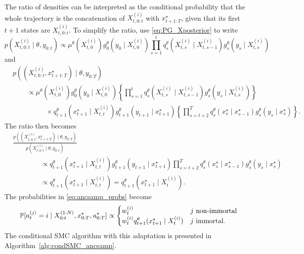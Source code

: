 The ratio of densities can be interpreted as the conditional probability that the whole trajectory is the concatenation of $X_{t,0:t}^{(i)}$ with $x_{t+1:T}^\star$, given that its first $t+1$ states are $X_{t,0:t}^{(i)}$.
To simplify the ratio, use \eqref{eq:PG_Xposterior} to write
\begin{equation*}
p( X_{t,0:t}^{(i)} \mid \theta, y_{0:t} )
\propto \mu^\theta( X_{t,0}^{(i)} ) g_0^\theta( y_0 \mid X_{t,0}^{(i)} ) 
        \prod_{s=1}^{t} q_s^\theta( X_{t,s}^{(i)} \mid X_{t,s-1}^{(i)} ) 
        g_s^\theta( y_s \mid X_{t,s}^{(i)} )
\end{equation*}
and %
\begin{align*}
&p( (X_{t,0:t}^{(i)}, x_{t+1:T}^\star) \mid \theta, y_{0:T} ) \\
&\qquad \propto \mu^\theta( X_{t,0}^{(i)} ) g_0^\theta( y_0 \mid X_{t,0}^{(i)} ) 
        \left\{ \prod_{s=1}^{t} q_s^\theta( X_{t,s}^{(i)} \mid X_{t,s-1}^{(i)} )
        g_s^\theta( y_s \mid X_{t,s}^{(i)} ) \right\} \\
    &\hspace{2cm}\times q_{t+1}^\theta( x_{t+1}^\star \mid X_{t,t}^{(i)} ) 
        g_{t+1}^\theta( y_{t+1} \mid x_{t+1}^\star )
        \left\{ \prod_{s=t+2}^T q_s^\theta(x_s^\star \mid x_{s-1}^\star)
        g_s^\theta(y_s \mid x_s^\star) \right\} .
\end{align*}
The ratio then becomes
\begin{align*}
&\frac{p( ( X_{t,0:t}^{(i)}, x_{t+1:T}^\star ) \mid \theta, y_{0:T} )}
        {p( X_{t,0:t}^{(i)} \mid \theta, y_{0:t} ) } \\
&\qquad\qquad\propto q_{t+1}^\theta( x_{t+1}^\star \mid X_{t,t}^{(i)} ) 
        g_{t+1}^\theta( y_{t+1} \mid x_{t+1}^\star )
        \prod_{s=t+2}^T q_s^\theta( x_s^\star \mid x_{s-1}^\star ) 
        g_s^\theta( y_s \mid x_s^\star ) \\
&\qquad\qquad\propto q_{t+1}^\theta( x_{t+1}^\star \mid X_{t,t}^{(i)} )
        = q_{t+1}^\theta( x_{t+1}^\star \mid X_{t}^{(i)} )  .
\end{align*}
The probabilities in \eqref{eq:ancsamp_probs} become
\begin{equation}\label{eq:ancsamp_probs_simplified}
\mathbb{P}[a_t^{(j)} = i \mid X_{0:t}^{(1:N)}, x_{0:T}^\star, a_{0:T}^\star ] 
\propto \begin{cases}
w_t^{(i)} & j \text{ non-immortal}\\
w_t^{(i)} q_{t+1}^\theta( x_{t+1}^\star \mid X_{t}^{(i)} ) & j \text{ immortal} .
\end{cases}
\end{equation}
The conditional SMC algorithm with this adaptation is presented in Algorithm~\ref{alg:condSMC_ancsamp}.

